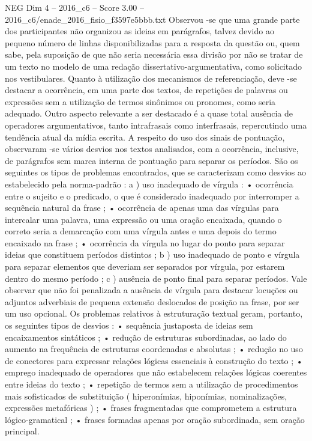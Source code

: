 \begin{textsample}{NEG Dim 4 – 2016\_c6 – Score 3.00 – 2016\_c6/enade\_2016\_fisio\_f3597e5bbb.txt}
Observou -se que uma grande parte dos participantes não organizou as ideias em parágrafos, talvez devido ao pequeno número de linhas disponibilizadas para a resposta da questão ou, quem sabe, pela suposição de que não seria necessária essa divisão por não se tratar de um texto no modelo de uma redação dissertativo-argumentativa, como solicitado nos vestibulares.
Quanto à utilização dos mecanismos de referenciação, deve -se destacar a ocorrência, em uma parte dos textos, de repetições de palavras ou expressões sem a utilização de termos sinônimos ou pronomes, como seria adequado.
Outro aspecto relevante a ser destacado é a quase total ausência de operadores argumentativos, tanto intrafrasais como interfrasais, repercutindo uma tendência atual da mídia escrita.
A respeito do uso dos sinais de pontuação, observaram -se vários desvios nos textos analisados, com a ocorrência, inclusive, de parágrafos sem marca interna de pontuação para separar os períodos.
São os seguintes os tipos de problemas encontrados, que se caracterizam como desvios ao estabelecido pela norma-padrão : a ) uso inadequado de vírgula : • ocorrência entre o sujeito e o predicado, o que é considerado inadequado por interromper a sequência natural da frase ; • ocorrência de apenas uma das vírgulas para intercalar uma palavra, uma expressão ou uma oração encaixada, quando o correto seria a demarcação com uma vírgula antes e uma depois do termo encaixado na frase ; • ocorrência da vírgula no lugar do ponto para separar ideias que constituem períodos distintos ; b ) uso inadequado de ponto e vírgula para separar elementos que deveriam ser separados por vírgula, por estarem dentro do mesmo período ; c ) ausência de ponto final para separar períodos.
Vale observar que não foi penalizada a ausência de vírgula para destacar locuções ou adjuntos adverbiais de pequena extensão deslocados de posição na frase, por ser um uso opcional.
Os problemas relativos à estruturação textual geram, portanto, os seguintes tipos de desvios : • sequência justaposta de ideias sem encaixamentos sintáticos ; • redução de estruturas subordinadas, ao lado do aumento na frequência de estruturas coordenadas e absolutas ; • redução no uso de conectores para expressar relações lógicas essenciais à construção do texto ; • emprego inadequado de operadores que não estabelecem relações lógicas coerentes entre ideias do texto ; • repetição de termos sem a utilização de procedimentos mais sofisticados de substituição ( hiperonímias, hiponímias, nominalizações, expressões metafóricas ) ; • frases fragmentadas que comprometem a estrutura lógico-gramatical ; • frases formadas apenas por oração subordinada, sem oração principal.

\end{textsample}
